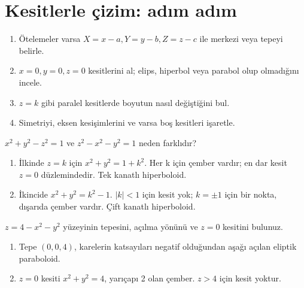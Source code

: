 \section{Kesitlerle çizim: adım adım}
\begin{enumerate}
\item Ötelemeler varsa \(X=x-a,Y=y-b,Z=z-c\) ile merkezi veya tepeyi belirle.
\item \(x=0,y=0,z=0\) kesitlerini al; elips, hiperbol veya parabol olup olmadığını incele.
\item \(z=k\) gibi paralel kesitlerde boyutun nasıl değiştiğini bul.
\item Simetriyi, eksen kesişimlerini ve varsa boş kesitleri işaretle.
\end{enumerate}
\begin{tcolorbox}[title={Örnek 2.16 | İki yüzeyin kesitlerini karşılaştır},colframe=accent]\(x^2+y^2-z^2=1\) ve \(z^2-x^2-y^2=1\) neden farklıdır?
\par\vspace{1mm}{\scriptsize\sffamily Pekiştirme}\end{tcolorbox}
\begin{tcolorbox}[title={Adım adım çözüm},colback=green!3!white,colframe=green]\begin{enumerate}
\item İlkinde \(z=k\) için \(x^2+y^2=1+k^2\). Her k için çember vardır; en dar kesit \(z=0\) düzlemindedir. Tek kanatlı hiperboloid.
\item İkincide \(x^2+y^2=k^2-1\). \(|k|<1\) için kesit yok; \(k=\pm1\) için bir nokta, dışarıda çember vardır. Çift kanatlı hiperboloid.
\end{enumerate}\end{tcolorbox}
\begin{tcolorbox}[title={Örnek 2.17 | Pekiştirme: yüzeyi tanı},colframe=accent]\(z=4-x^2-y^2\) yüzeyinin tepesini, açılma yönünü ve \(z=0\) kesitini bulunuz.
\par\vspace{1mm}{\scriptsize\sffamily Pekiştirme}\end{tcolorbox}
\begin{tcolorbox}[title={Adım adım çözüm},colback=green!3!white,colframe=green]\begin{enumerate}
\item Tepe \((0,0,4)\), karelerin katsayıları negatif olduğundan aşağı açılan eliptik paraboloid.
\item \(z=0\) kesiti \(x^2+y^2=4\), yarıçapı 2 olan çember. \(z>4\) için kesit yoktur.
\end{enumerate}\end{tcolorbox}

